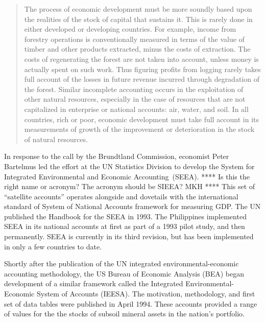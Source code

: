 \begin{quote}
	The process of economic development must be more soundly 
	based upon the realities of the stock of capital that sustains it. 
	This is rarely done in either developed or developing countries. 
	For example, income from forestry operations is conventionally measured 
	in terms of the value of timber and other products extracted, 
	minus the costs of extraction. 
	The costs of regenerating the forest are not taken into account, 
	unless money is actually spent on such work. 
	Thus figuring profits from logging rarely takes full account 
	of the losses in future revenue incurred through degradation of the forest. 
	Similar incomplete accounting occurs in the exploitation 
	of other natural resources, 
	especially in the case of resources that are not capitalized 
	in enterprise or national accounts: air, water, and soil. 
	In all countries, rich or poor, 
	economic development must take full account 
	in its measurements of growth of the improvement or 
	deterioration in the stock 
	of natural resources.\cite[Chapter 2, paragraph 36]{brundtland1987}
\end{quote}

In response to the call by the Brundtland Commission, 
economist Peter Bartelmus led the effort at the UN Statistics Division 
to develop the 
System for Integrated Environmental and Economic Accounting~(SEEA).\cite{Bartelmus1991} 
**** Is this the right name or acronym? The acronym should be SIEEA? MKH ****
This set of ``satellite accounts'' operates alongside and dovetails with 
the international standard of System of National Accounts framework for measuring GDP. 
The UN published the Handbook for the SEEA in 1993.\cite{UNSEEA1993} 
The Philippines implemented SEEA in its national accounts 
at first as part of a 1993 pilot study, 
and then permanently.\cite{uno1998, PhilippinesSEEAWeb}
SEEA is currently in its third revision, 
but has been implemented 
in only a few countries to date.\cite{UNSEEAWeb,PhilippinesSEEAWeb} 

Shortly after the publication 
of the UN integrated environmental-economic accounting methodology, 
the US Bureau of Economic Analysis (BEA) began development of a similar
framework called the 
Integrated Environmental-Economic System of Accounts (IEESA). 
The motivation, methodology, and first set of data tables were published 
in April 1994.\cite{BEA1994a} 
These accounts provided a range of values 
for the the stocks of subsoil mineral assets in the nation’s portfolio. 

